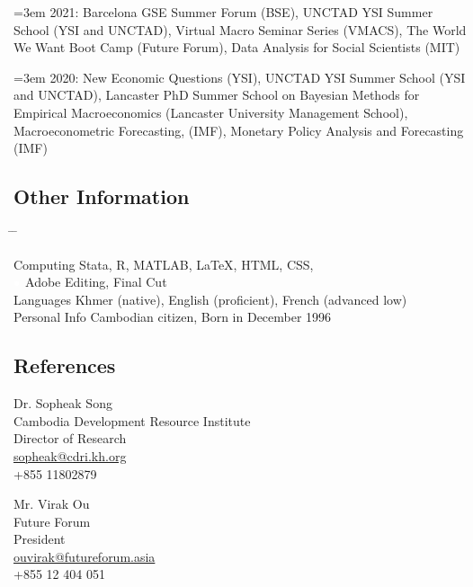 \documentclass[10pt,a4paper]{article}
\newcommand{\tabbedblock}[1]{

	\begin{tabbing}
		\hspace{3cm} \= \hspace{4cm} \= \kill
		#1
	\end{tabbing}
}
\begin{document}
\hangindent=3em
	2021: Barcelona GSE Summer Forum (BSE), UNCTAD YSI Summer School (YSI and UNCTAD), Virtual Macro Seminar Series (VMACS), The World We Want Boot Camp (Future Forum), Data Analysis for Social Scientists (MIT)

\hangindent=3em
	2020: New Economic Questions (YSI), UNCTAD YSI Summer School (YSI and UNCTAD), Lancaster PhD Summer School on Bayesian Methods for Empirical Macroeconomics (Lancaster University Management School), Macroeconometric Forecasting, (IMF), Monetary Policy Analysis and Forecasting (IMF)

\subsection*{Other Information}

\tabbedblock{
	Computing \> Stata, R, MATLAB, \LaTeX, HTML, CSS, \\
	\> $\color{white}{\bullet}$ Adobe Editing, Final Cut\\

	Languages \> Khmer (native), English (proficient), French (advanced low)\\
	
	Personal Info \> Cambodian citizen, Born in December 1996
}

\subsection*{References}		

\parbox{0.5\textwidth}{ %
	Dr. Sopheak Song\\ 
	Cambodia Development Resource Institute\\ 
	Director of Research\\
	\href{mailto: sopheak@cdri.kh.org}{sopheak@cdri.kh.org}\\
	+855 11802879
}
\hfill %
\parbox{0.5\textwidth}{ %
	Mr. Virak Ou\\ 
	Future Forum\\ 
	President\\
	\href{mailto: ouvirak@futureforum.asia}{ouvirak@futureforum.asia}\\
	+855 12 404 051
}

\end{document}
